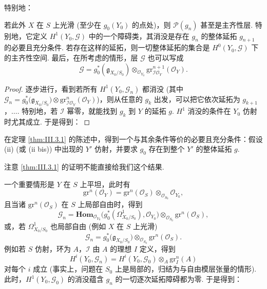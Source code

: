 特别地：

\begin{corollary}\label{cor:III.5.4}
若此外 $X$ 在 $S$ 上光滑 (至少在 $g_0(Y_0)$ 的点处)，则 $\mathcal{P}(g_n)$ 甚至是主齐性层. 特别地，它定义 $H^1(Y_0, \mathcal{G})$ 中的一个障碍类，其消没是存在 $g_n$ 的整体延拓 $g_{n+1}$ 的必要且充分条件. 若存在这样的延拓，则一切整体延拓的集合是 $H^0(Y_0, \mathcal{G})$ 下的主齐性空间. 最后，在所考虑的情形，层 $\mathcal{G}$ 也可以写成
\[
\mathcal{G} = g_0^{*}(\mathfrak{g}_{X_0/S_0}) \otimes_{\mathcal{O}_{Y_0}} \mathrm{gr}_{\mathcal{I}\mathcal{O}_Y}^{n+1}(\mathcal{O}_Y).
\]
\end{corollary}

\begin{proof}
逐步进行，看到若所有 $H^1(Y_0, \mathcal{G}_n)$ 都消没 (其中 $\mathcal{G}_n = g_0^{*}\bigl(\mathfrak{g}_{X_0/S_0}\bigr) \otimes \mathrm{gr}_{\mathcal{I}\mathcal{O}_Y}^{n}(\mathcal{O}_Y)$)，则从任意的 $g_k$ 出发，可以把它依次延拓为 $g_{k+1}$，$\dots$. 特别地，若 $\mathcal{I}$ 幂零，就能找到 $g_k$ 到 $Y$ 的延拓 $g$. $H^1$ 消没的条件在 $Y_0$ 仿射时尤其成立. 于是得到：
\end{proof}

\begin{corollary}\label{cor:III.5.5}
在定理 \ref{thm:III.3.1} 的陈述中，得到一个与其余条件等价的必要且充分条件：假设 (ii) (或 (ii bis)) 中出现的 $Y'$ 仿射，并要求 $g_0$ 存在到整个 $Y'$ 的整体延拓 $g$.
\end{corollary}

注意 \ref{thm:III.3.1} 的证明不能直接给我们这个结果.

一个重要情形是 $Y$ 在 $S$ 上平坦，此时有
\[
\mathrm{gr}^{n}(\mathcal{O}_Y) = \mathrm{gr}^{n}(\mathcal{O}_S) \otimes_{\mathcal{O}_{S_0}} \mathcal{O}_{Y_0},
\]
且当诸 $\mathrm{gr}^{n}(\mathcal{O}_S)$ 在 $S$ 上局部自由时，得到
\[
\mathcal{G}_n = \mathbf{Hom}_{\mathcal{O}_{Y_0}}\bigl(g_0^{*}(\varOmega_{X_0/S_0}^{1}), \mathcal{O}_{Y_0}\bigr) \otimes_{\mathcal{O}_{S_0}} \mathrm{gr}^{n}(\mathcal{O}_S),
\]
或，若 $\varOmega_{X_0/S_0}^{1}$ 也局部自由 (例如 $X$ 在 $S$ 上光滑)
\[
\mathcal{G}_n = g_0^{*}\bigl(\mathfrak{g}_{X_0/S_0}\bigr) \otimes_{\mathcal{O}_{S_0}} \mathrm{gr}^{n}(\mathcal{O}_S).
\]
例如若 $S$ 仿射，环为 $A$，$\mathcal{I}$ 由 $A$ 的理想 $I$ 定义，得到
\[
H^{i}(Y_0, \mathcal{G}_n) = H^{i}(Y_0, \mathcal{G}_0) \otimes_A \mathrm{gr}_{I}^{n}(A)
\]
对每个 $i$ 成立 (事实上，问题在 $S_0$ 上是局部的，归结为与自由模层张量的情形). 此时，$H^1(Y_0, \mathcal{G}_0)$ 的消没蕴含 $g_n$ 的一切逐次延拓障碍都为零. 于是得到：

